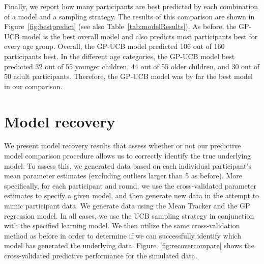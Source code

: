 Finally, we report how many participants are best predicted by each combination of a model and a sampling strategy. The results of this comparison are shown in Figure~\ref{fig:bestpredict} (see also Table~\ref{tab:modelResults}). As before, the GP-UCB model is the best overall model and also predicts most participants best for every age group. Overall, the GP-UCB model predicted 106 out of 160 participants best. In the different age categories, the GP-UCB model best predicted 32 out of 55 younger children, 44 out of 55 older children, and 30 out of 50 adult participants. Therefore, the GP-UCB model was by far the best model in our comparison.




\section*{Model recovery}

We present model recovery results that assess whether or not our predictive model comparison procedure allows us to correctly identify the true underlying model. To assess this, we generated data based on each individual participant's mean parameter estimates (excluding outliers larger than 5 as before). More specifically, for each participant and round, we use the cross-validated parameter estimates to specify a given model, and then generate new data in the attempt to mimic participant data. We generate data using the Mean Tracker and the GP regression model. In all cases, we use the UCB sampling strategy in conjunction with the specified learning model. We then utilize the same cross-validation method as before in order to determine if we can successfully identify which model has generated the underlying data. Figure~\ref{fig:recovercompare} shows the cross-validated predictive performance for the simulated data. 

